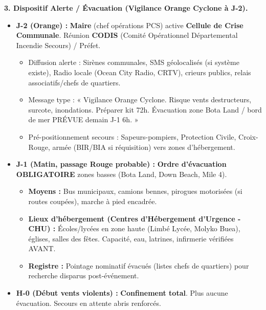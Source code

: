 \documentclass[11pt]{article}
\begin{document}
\begin{exoresolu}
\textbf{3. Dispositif Alerte / Évacuation (Vigilance Orange Cyclone à J-2).}
\begin{itemize}
    \item \textbf{J-2 (Orange) :} \textbf{Maire} (chef opérations PCS) active \textbf{Cellule de Crise Communale}. Réunion \textbf{CODIS} (Comité Opérationnel Départemental Incendie Secours) / Préfet.
    \begin{itemize}
        \item Diffusion alerte : Sirènes communales, SMS géolocalisés (si système existe), Radio locale (Ocean City Radio, CRTV), crieurs publics, relais associatifs/chefs de quartiers.
        \item Message type : « Vigilance Orange Cyclone. Risque vents destructeurs, surcote, inondations. Préparer kit 72h. Évacuation zone Bota Land / bord de mer PRÉVUE demain J-1 6h. »
        \item Pré-positionnement secours : Sapeurs-pompiers, Protection Civile, Croix-Rouge, armée (BIR/BIA si réquisition) vers zones d'hébergement.
    \end{itemize}
    \item \textbf{J-1 (Matin, passage Rouge probable) :} \textbf{Ordre d'évacuation OBLIGATOIRE} zones basses (Bota Land, Down Beach, Mile 4).
    \begin{itemize}
        \item \textbf{Moyens :} Bus municipaux, camions bennes, pirogues motorisées (si routes coupées), marche à pied encadrée.
        \item \textbf{Lieux d'hébergement (Centres d'Hébergement d'Urgence - CHU) :} Écoles/lycées en zone haute (Limbé Lycée, Molyko Buea), églises, salles des fêtes. Capacité, eau, latrines, infirmerie vérifiées AVANT.
        \item \textbf{Registre :} Pointage nominatif évacués (listes chefs de quartiers) pour recherche disparus post-événement.
    \end{itemize}
    \item \textbf{H-0 (Début vents violents) :} \textbf{Confinement total}. Plus aucune évacuation. Secours en attente abris renforcés.
\end{itemize}


\end{exoresolu}
\end{document}
